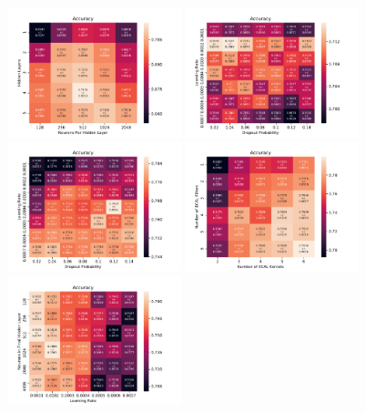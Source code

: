 \begin{figure}[htbp]
\centering
\includegraphics[width=0.45\textwidth]{Images/Calo/DNN_hl_nhl.pdf}
\includegraphics[width=0.45\textwidth]{Images/Calo/DNN_lr_dp.pdf} \\
\includegraphics[width=0.45\textwidth]{Images/Calo/CNN_lr_dp.pdf}
\includegraphics[width=0.45\textwidth]{Images/Calo/CNN_nECALfilt_nECALkern.pdf} \\
\includegraphics[width=0.45\textwidth]{Images/Calo/GN_nhl_lr.pdf}

\end{figure}
